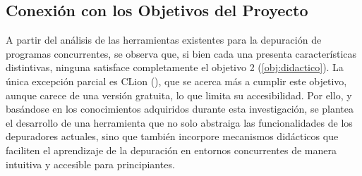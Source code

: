 
\subsection{Conexión con los Objetivos del Proyecto}{\label{subsec:conexión-objetivos-proyecto}}

A partir del análisis de las herramientas existentes para la depuración de programas concurrentes, se observa que, si bien cada una presenta características distintivas, ninguna satisface completamente el objetivo 2 (\ref{obj:didactico}). La única excepción parcial es CLion (), que se acerca más a cumplir este objetivo, aunque carece de una versión gratuita, lo que limita su accesibilidad. Por ello, y basándose en los conocimientos adquiridos durante esta investigación, se plantea el desarrollo de una herramienta que no solo abstraiga las funcionalidades de los depuradores actuales, sino que también incorpore mecanismos didácticos que faciliten el aprendizaje de la depuración en entornos concurrentes de manera intuitiva y accesible para principiantes.



